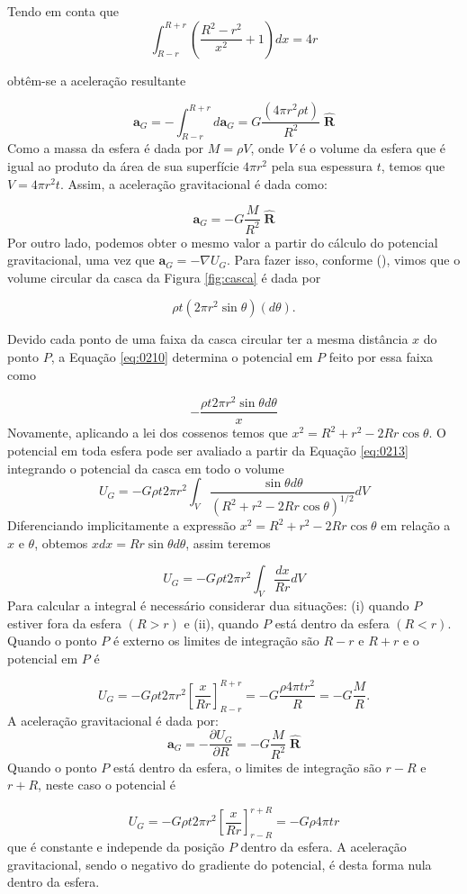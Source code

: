 \documentclass[]{book}
\theoremstyle{definition}
\theoremstyle{definition}
\theoremstyle{definition}
\theoremstyle{remark}
\begin{document}
Tendo em conta que
\[\int_{R-r}^{R+r}\left(\frac{R^2-r^2}{x^2}+1\right) dx =4r \]

obtêm-se a aceleração resultante

\[ \mathbf{a}_G = -\int_{R-r}^{R+r}d\mathbf{a}_G = G\frac{(4\pi r^2\rho t)}{R^2} \; \hat{\mathbf{R}}\]
Como a massa da esfera é dada por \(M=\rho V\), onde \(V\) é o volume da esfera que é igual ao produto da área de sua superfície \(4\pi r^2\) pela sua espessura \(t\), temos que \(V=4\pi r^2t\). Assim, a aceleração gravitacional é dada como:

\[ \mathbf{a}_G = -G\frac{M}{R^2}\; \hat{\mathbf{R}}\]
Por outro lado, podemos obter o mesmo valor a partir do cálculo do potencial gravitacional, uma vez que \(\mathbf{a}_G= -\nabla U_G\). Para fazer isso, conforme (\citet{fowler1990solid}), vimos que o volume circular da casca da Figura \ref{fig:casca} é dada por

\[ \rho t (2\pi r^2 \sin{\theta})(d\theta).\]

Devido cada ponto de uma faixa da casca circular ter a mesma distância \(x\) do ponto \(P\), a Equação \eqref{eq:0210} determina o potencial em \(P\) feito por essa faixa como

\[ -\frac{\rho t 2\pi r^2 \sin{\theta}d\theta}{x}\]
Novamente, aplicando a lei dos cossenos temos que \(x^2=R^2+r^2-2Rr\cos\theta.\) O potencial em toda esfera pode ser avaliado a partir da Equação \eqref{eq:0213} integrando o potencial da casca em todo o volume
\[ U_G = -G\rho t 2\pi r^2 \int_V\frac{\sin{\theta}d\theta}{(R^2+r^2-2Rr\cos\theta)^{1/2}} dV\]
Diferenciando implicitamente a expressão \(x^2=R^2+r^2-2Rr\cos\theta\) em relação a \(x\) e \(\theta\), obtemos \(xdx=Rr\sin{\theta}d\theta\), assim teremos

\[ U_G = -G\rho t 2\pi r^2 \int_V\frac{dx}{R r} dV\]
Para calcular a integral é necessário considerar dua situações: (i) quando \(P\) estiver fora da esfera \((R>r)\) e (ii), quando \(P\) está dentro da esfera \((R<r)\). Quando o ponto \(P\) é externo os limites de integração são \(R-r\) e \(R+r\) e o potencial em \(P\) é

\[ U_G = -G\rho t 2\pi r^2\left[\frac{x}{Rr}\right]_{R-r}^{R+r}=-G\frac{\rho 4\pi t r^2}{R} = -G\frac{M}{R}.\]
A aceleração gravitacional é dada por:
\[ \mathbf{a}_G = - \frac{\partial U_G}{\partial R} = -G\frac{M}{R^2}\;\hat{\mathbf{R}}\]
Quando o ponto \(P\) está dentro da esfera, o limites de integração são \(r-R\) e \(r+R\), neste caso o potencial é

\[ U_G = -G\rho t 2\pi r^2\left[\frac{x}{Rr}\right]_{r-R}^{r+R}=-G \rho 4\pi t r\]
que é constante e independe da posição \(P\) dentro da esfera. A aceleração gravitacional, sendo o negativo do gradiente do potencial, é desta forma nula dentro da esfera.
\end{document}

